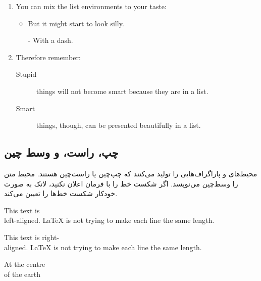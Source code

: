 \begin{example}
\flushleft
\begin{enumerate}
\item You can mix the list
environments to your taste:
\begin{itemize}
\item But it might start to
look silly. 
\item[-] With a dash.
\end{itemize}
\item Therefore remember:
\begin{description}
\item[Stupid] things will not
become smart because they are
in a list.
\item[Smart] things, though,
can be presented beautifully
in a list.
\end{description}
\end{enumerate}
\end{example}
\subsection{چپ، راست، و وسط چین}
محیط‌های
و 
پاراگراف‌هایی را تولید می‌کنند که چپ‌چین یا راست‌\-چین هستند. 
محیط 
متن را وسط‌چین می‌نویسد. اگر شکست خط را با فرمان  
\ci{\bs} 
اعلان نکنید، لاتک به صورت خودکار شکست خط‌ها را تعیین می‌کند.


\begin{example}
\begin{flushleft}
This text is\\ left-aligned. 
\LaTeX{} is not trying to make 
each line the same length.
\end{flushleft}
\end{example}

\begin{example}
\begin{flushright}
This text is right-\\aligned. 
\LaTeX{} is not trying to make
each line the same length.
\end{flushright}
\end{example}

\begin{example}
\begin{center}
At the centre\\of the earth
\end{center}
\end{example}


